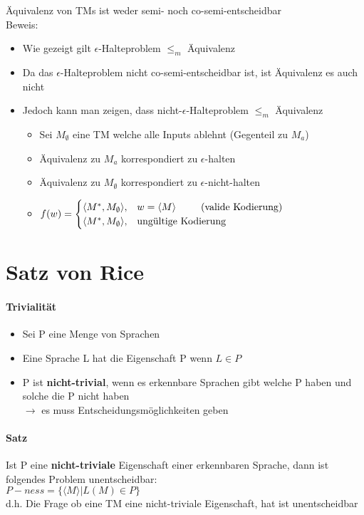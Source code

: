 \documentclass[12pt,a4paper]{article}
\begin{document}
Äquivalenz von TMs ist weder semi- noch co-semi-entscheidbar\\
Beweis:
\begin{itemize}
\item Wie gezeigt gilt $\epsilon$-Halteproblem $\leq_m$ Äquivalenz
\item Da das $\epsilon$-Halteproblem nicht co-semi-entscheidbar ist, ist Äquivalenz es auch nicht
\item Jedoch kann man zeigen, dass nicht-$\epsilon$-Halteproblem $\leq_m$ Äquivalenz
\begin{itemize}
\item Sei $M_\emptyset$ eine TM welche alle Inputs ablehnt (Gegenteil zu $M_a$)
\item Äquivalenz zu $M_a$ korrespondiert zu $\epsilon$-halten
\item Äquivalenz zu $M_\emptyset$ korrespondiert zu $\epsilon$-nicht-halten
\item $\displaystyle f(w) = \begin{cases} \langle M^*, M_\emptyset \rangle, & w= \langle M \rangle \text{\hspace{25pt}(valide Kodierung)} \\ \langle M^*, M_\emptyset \rangle, & \text{ungültige Kodierung} \end{cases}$
\end{itemize}
\end{itemize}


\section{Satz von Rice}
\paragraph{Trivialität}
\flushleft
\begin{itemize}
\item Sei P eine Menge von Sprachen
\item Eine Sprache L hat die Eigenschaft P wenn $L \in P$
\item P ist \textbf{nicht-trivial}, wenn es erkennbare Sprachen gibt welche P haben und solche die P nicht haben\\
$\rightarrow$ es muss Entscheidungsmöglichkeiten geben
\end{itemize}

\paragraph{Satz}
\flushleft
Ist P eine \textbf{nicht-triviale} Eigenschaft einer erkennbaren Sprache, dann ist folgendes Problem unentscheidbar:\\
$P-ness = \{\langle M \rangle \vert L(M) \in P\}$\\
d.h. Die Frage ob eine TM eine nicht-triviale Eigenschaft, hat ist unentscheidbar
\end{document}
